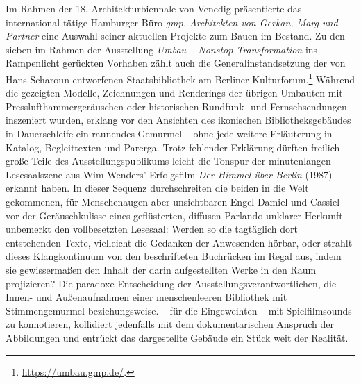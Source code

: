 \documentclass[a4paper,
fontsize=11pt,
oneside,
numbers=noperiodatend,
parskip=half-,
bibliography=totoc,
final
]{scrartcl}
\begin{document}
Im Rahmen der 18. Architekturbiennale von Venedig präsentierte das
international tätige Hamburger Büro \emph{gmp. Architekten von Gerkan,
Marg und Partner} eine Auswahl seiner aktuellen Projekte zum Bauen im
Bestand. Zu den sieben im Rahmen der Ausstellung \emph{Umbau -- Nonstop
Transformation} ins Rampenlicht gerückten Vorhaben zählt auch die
Generalinstandsetzung der von Hans Scharoun entworfenen Staatsbibliothek
am Berliner Kulturforum.\footnote{\url{https://umbau.gmp.de/}.} Während
die gezeigten Modelle, Zeichnungen und Renderings der übrigen Umbauten
mit Presslufthammergeräuschen oder historischen Rundfunk- und
Fernsehsendungen inszeniert wurden, erklang vor den Ansichten des
ikonischen Bibliotheksgebäudes in Dauerschleife ein raunendes Gemurmel
-- ohne jede weitere Erläuterung in Katalog, Begleittexten und Parerga.
Trotz fehlender Erklärung dürften freilich große Teile des
Ausstellungspublikums leicht die Tonspur der minutenlangen Lesesaalszene
aus Wim Wenders' Erfolgsfilm \emph{Der Himmel über Berlin} (1987)
erkannt haben. In dieser Sequenz durchschreiten die beiden in die Welt
gekommenen, für Menschenaugen aber unsichtbaren Engel Damiel und Cassiel
vor der Geräuschkulisse eines geflüsterten, diffusen Parlando unklarer
Herkunft unbemerkt den vollbesetzten Lesesaal: Werden so die tagtäglich
dort entstehenden Texte, vielleicht die Gedanken der Anwesenden hörbar,
oder strahlt dieses Klangkontinuum von den beschrifteten Buchrücken im
Regal aus, indem sie gewissermaßen den Inhalt der darin aufgestellten
Werke in den Raum projizieren? Die paradoxe Entscheidung der
Ausstellungsverantwortlichen, die Innen- und Außenaufnahmen einer
menschenleeren Bibliothek mit Stimmengemurmel beziehungsweise. -- für
die Eingeweihten -- mit Spielfilmsounds zu konnotieren, kollidiert
jedenfalls mit dem dokumentarischen Anspruch der Abbildungen und
entrückt das dargestellte Gebäude ein Stück weit der Realität.
\end{document}
